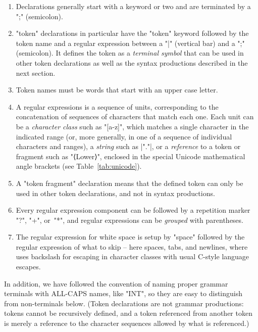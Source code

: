 \documentclass[11pt]{article} %
\begin{document}
\begin{notation}\leavevmode
  \begin{enumerate}

  \item Declarations generally start with a keyword or two and are terminated by a ";" (semicolon).

  \item "token" declarations in particular have the "token" keyword followed by the token name and a
    regular expression between a "|" (vertical bar) and a ";" (semicolon). It defines the token as a
    \emph{terminal symbol} that can be used in other token declarations as well as the syntax
    productions described in the next section.

  \item Token names must be words that start with an upper case letter.

  \item A regular expressions is a sequence of units, corresponding to the concatenation of
    sequences of characters that match each one.  Each unit can be a \emph{character class} such as
    "[a-z]", which matches a single character in the indicated range (or, more generally, in one of
    a sequence of individual characters and ranges), a \emph{string} such as \hacsc|"."|, or a
    \emph{reference} to a token or fragment such as "⟨Lower⟩", enclosed in the special Unicode
    mathematical angle brackets (see Table~\ref{tab:unicode}).

  \item A "token fragment" declaration means that the defined token can only be used in other token
    declarations, and not in syntax productions.

  \item Every regular expression component can be followed by a repetition marker "?", "+", or~"*",
    and regular expressions can be \emph{grouped} with parentheses.

  \item The regular expression for white space is setup by "space" followed by the regular
    expression of what to skip -- here spaces, tabs, and newlines, where \HAX uses backslash for
    escaping in character classes with usual C-style language escapes.

  \end{enumerate}
  In addition, we have followed the convention of naming proper grammar terminals with ALL-CAPS
  names, like "INT", so they are easy to distinguish from non-terminals below. (Token declarations
  are not grammar productions: tokens cannot be recursively defined, and a token referenced from
  another token is merely a reference to the character sequences allowed by what is referenced.)
\end{notation}
\end{document}
